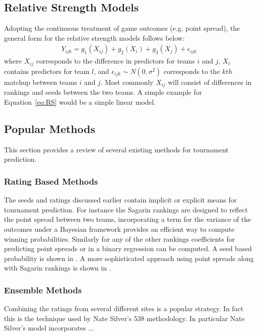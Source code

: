 \subsection{Relative Strength Models}
Adopting the continuous treatment of game outcomes (e.g. point spread), the general form for the relative strength models follows below:
\begin{eqnarray}
Y_{ijk} = g_1(X_{ij}) + g_2(X_i) + g_3(X_j) +  \epsilon_{ijk}
\label{eq:RS}
\end{eqnarray}
where $X_{ij}$ corresponds to the difference in predictors for teams $i$ and $j$, $X_l$ contains predictors for team $l$, and $\epsilon_{ijk} \sim N(0,\sigma^2)$ corresponds to the $kth$ matchup between teams $i$ and $j$.  Most commonly $X_{ij}$ will consist of differences in rankings and seeds between the two teams.  A simple example for Equation~\ref{eq:RS} would be a simple linear model.

\subsection{Popular Methods}  This section provides a review of several existing methods for tournament prediction.
\subsubsection{Rating Based Methods} 
The seeds and ratings discussed earlier contain implicit or explicit means for tournament prediction.  For instance the Sagarin rankings are designed to reflect the point spread between two teams, incorporating a term for the variance of the outcomes under a Bayesian framework provides an efficient way to compute winning probabilities.  Similarly for any of the other rankings coefficients for predicting point spreads or in a binary regression can be computed. A seed based probability is shown in \cite{schwertman1996}.  A more sophisticated approach using point spreads along with Sagarin rankings is shown in \cite{carlin1996}.
\subsubsection{Ensemble Methods}
Combining the ratings from several different sites is a popular strategy.  In fact this is the technique used by Nate Silver's 538 methodology.  In particular Nate Silver's model incorporates ... 

